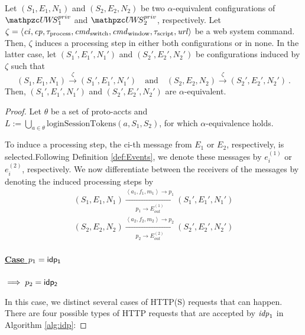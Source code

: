 \begin{theorem}
  \begin{lemma}\label{lemma:rp:step-config-private}
    Let $(S_1,E_1,N_1)$ and $(S_2,E_2,N_2)$ be two 
    $\alpha$-equivalent configurations of 
    $\uppressoprivwebsystem_1$ and $\uppressoprivwebsystem_2$, 
    respectively. Let $\zeta = \langle\mathit{ci},\mathit{cp}, 
    \tau_\text{process}, \mathit{cmd}_\text{switch}, 
    \mathit{cmd}_\text{window},\tau_\text{script},\mathit{url}\rangle$
    be a web system command. Then, $\zeta$ induces a processing 
    step in either both configurations or in none. In the latter 
    case, let $(S_1',E_1',N_1')$ and $(S_2',E_2',N_2')$ be 
    configurations induced by $\zeta$ such that
    \[(S_1,E_1,N_1) \xrightarrow{\zeta} (S_1',E_1',N_1') \quad 
    \text{and} \quad (S_2,E_2,N_2) \xrightarrow{\zeta} 
    (S_2',E_2',N_2') \ .\]
    Then, $(S_1',E_1',N_1')$ and $(S_2',E_2',N_2')$ are
    $\alpha$-equivalent.  
  \end{lemma}
  \begin{proof}
    Let $\theta$ be a set of proto-accts and 
    $L:=\bigcup_{a\in\theta}\text{loginSessionTokens}(a,S_1,S_2)$, 
    for which $\alpha$-equivalence holds.
    
    To induce a processing step, the ci-th message from $E_1$ or 
    $E_2$, respectively, is selected.Following Definition 
    \ref{def:Events}, we denote these messages by $e_i^{(1)}$ or 
    $e_i^{(2)}$, respectively. We now differentiate between the 
    receivers of the messages by denoting the induced processing 
    steps by
    \begin{equation}
      \begin{aligned}
        (S_1,E_1,N_1)\xrightarrow[p_1\rightarrow E_{out}^{(1)}]{\left \langle a_1,f_1,m_1\right \rangle\rightarrow p_1}(S_1\prime,E_1\prime,N_1\prime)\\
        (S_2,E_2,N_2)\xrightarrow[p_2\rightarrow E_{out}^{(2)}]{\left \langle a_2,f_2,m_2\right \rangle\rightarrow p_2}(S_2\prime,E_2\prime,N_2\prime)
      \end{aligned}
    \end{equation}
    \paragraph{\underline{Case $p_1 = \mathsf{idp_1}$}}
    $\implies p_2 = \mathsf{idp_2}$

    In this case, we distinct several cases of HTTP(S) requests that can happen.
    There are four possible types of HTTP requests that are accepted by $\mathit{idp}_1$ in Algorithm \ref{alg:idp}:
    

\end{proof}
\end{theorem}
